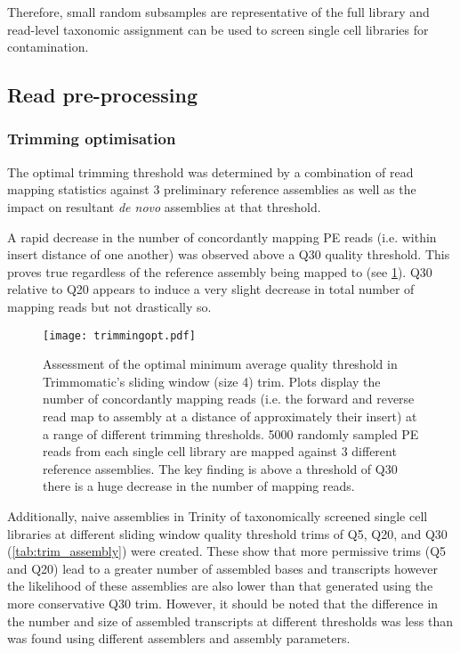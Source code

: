 Therefore, small random subsamples are representative of the full library and
read-level taxonomic assignment can be used to screen single cell libraries for contamination.


\subsection{Read pre-processing} 

\subsubsection{Trimming optimisation}

The optimal trimming threshold was determined by a combination
of read mapping statistics against 3 preliminary reference assemblies
as well as the impact on resultant \textit{de novo} assemblies at 
that threshold.

A rapid decrease in the number of concordantly mapping PE reads (i.e.
within insert distance of one another) was observed above a Q30 quality threshold.
This proves true regardless of the reference assembly being mapped to
(see \cref{fig:trimmingopt}).  Q30 relative to Q20 appears to induce a 
very slight decrease in total number of mapping reads but not drastically so. 

\begin{figure}[hp]
	\centering
    \texttt{[image: trimmingopt.pdf]}
    \caption[Optimising trimming thresholds]{Assessment of the optimal minimum average quality threshold
             in Trimmomatic's sliding window (size 4) trim.  Plots
             display the number of concordantly mapping reads (i.e. the forward
                 and reverse read map to assembly at a distance of approximately
                 their insert)
             at a range of different trimming
             thresholds.  5000 randomly sampled PE reads 
             from each single cell library are mapped against 3 different 
             reference assemblies. 
             The key finding is above a threshold of Q30 there is a huge
         decrease in the number of mapping reads.}
         \label{fig:trimmingopt}
\end{figure}

Additionally, naive assemblies in Trinity of taxonomically screened single cell libraries
at different sliding window quality threshold trims of Q5, Q20, and Q30 (\cref{tab:trim_assembly})
were created. 
These show that more permissive trims (Q5 and Q20) lead to a greater number of assembled bases and transcripts 
however the likelihood of these assemblies are also lower than that generated using the 
more conservative Q30 trim. 
However, it should be noted that the difference in the number and size of assembled transcripts at different thresholds 
was less than was found using different assemblers and assembly parameters.

